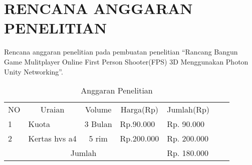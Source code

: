 \chapter*{RENCANA ANGGARAN PENELITIAN}
Rencana anggaran penelitian pada pembuatan penelitian “Rancang Bangun Game Mulitplayer Online First Person Shooter(FPS) 3D Menggunakan Photon Unity Networking”.

\begin{table}[h]
    \centering
    \begin{tabular}{|llcl|l|ll}
    \cline{1-5}
    \multicolumn{1}{|c|}{NO} & \multicolumn{1}{c|}{Uraian}          & \multicolumn{1}{c|}{Volume}  & \multicolumn{1}{c|}{Harga(Rp)} & Jumlah(Rp)    &  &  \\ \cline{1-5}
    \multicolumn{1}{|l|}{1}  & \multicolumn{1}{l|}{Kuota}           & \multicolumn{1}{c|}{3 Bulan} & Rp.90.000                      & Rp. 90.000  &  &  \\ \cline{1-5}
    \multicolumn{1}{|l|}{2}  & \multicolumn{1}{l|}{Kertas hvs a4}           & \multicolumn{1}{c|}{5 rim} & Rp.200.000                      & Rp. 200.000   &  &  \\ \cline{1-5}
    \multicolumn{4}{|c|}{Jumlah}                                                                                                    & Rp. 180.000 &  &  \\ \cline{1-5}
    \end{tabular}
    \caption{Anggaran Penelitian}
    \label{lab:label-anggaran}
    \end{table}